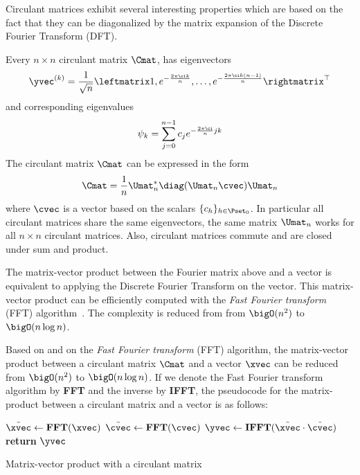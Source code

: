 Circulant matrices exhibit several interesting properties which are based on the fact that they can be diagonalized by the matrix expansion of the Discrete Fourier Transform (DFT).



\begin{theorem} \label{theorem:ch2-diagonalization_circulant_matrix}
  Every $n \times n$ circulant matrix $\Cmat$, has eigenvectors  
  \begin{equation}
    \yvec^{(k)} = \frac{1}{\sqrt{n}} \leftmatrix 1, e^{-\frac{2 \pi \ci k}{n}}, \dots, e^{-\frac{2 \pi \ci k(n-1)}{n}} \rightmatrix^\top
  \end{equation}
  and corresponding eigenvalues
  \begin{equation}
    \psi_k = \sum_{j=0}^{n-1} c_j e^{-\frac{2 \pi \ci}{n} jk}
  \end{equation}
  The circulant matrix $\Cmat$ can be expressed in the form 
  \begin{equation} \label{equation:ch2-diagonalization_circulant_matrix}
    \Cmat = \frac{1}{n} \Umat_n^* \diag(\Umat_n \cvec) \Umat_n
  \end{equation}
  where $\cvec$ is a vector based on the scalars $\{c_h\}_{h \in \Pset_0}$.
  In particular all circulant matrices share the same eigenvectors, the same matrix $\Umat_n$ works for all $n \times n$ circulant matrices.
  Also, circulant matrices commute and are closed under sum and product.
\end{theorem}


The matrix-vector product between the Fourier matrix above and a vector is equivalent to applying the Discrete Fourier Transform on the vector.
This matrix-vector product can be efficiently computed with the \emph{Fast Fourier transform} (FFT) algorithm~\cite{cooley1965algorithm}.
The complexity is reduced from from $\bigO(n^2)$ to $\bigO(n \log n)$.


\noindent
Based on  and on the \emph{Fast Fourier transform} (FFT) algorithm, the matrix-vector product between a circulant matrix $\Cmat$ and a vector $\xvec$ can be reduced from $\bigO(n^2)$ to $\bigO(n \log n)$.
If we denote the Fast Fourier transform algorithm by \textbf{FFT} and the inverse by \textbf{IFFT}, the pseudocode for the matrix-product between a circulant matrix and a vector is as follows:
\begin{algorithm}[h]
  \begin{algorithmic}[1]
     
      \State $\tilde{\xvec} \gets \textbf{FFT}(\xvec)$
      \State $\tilde{\cvec} \gets \textbf{FFT}(\cvec)$
      \State $\yvec \gets \textbf{IFFT}(\tilde{\xvec} \cdot \tilde{\cvec})$ 
      \State \textbf{return} $\yvec$ 
    \EndProcedure
  \end{algorithmic}
  \caption{Matrix-vector product with a circulant matrix}
  \label{algorithm:ch2-matrix_vector_product_circulant_matrix}
\end{algorithm}

